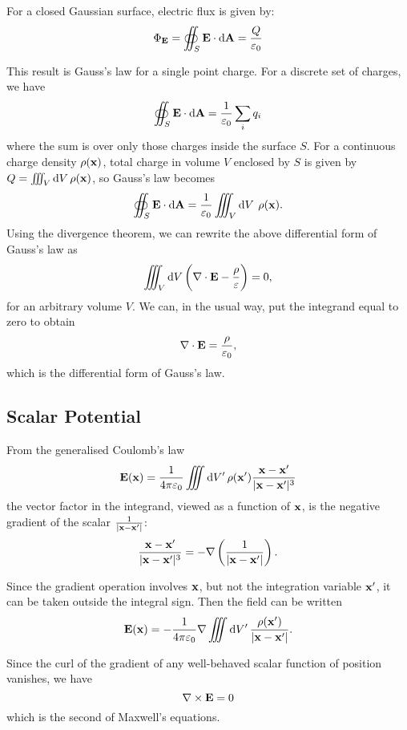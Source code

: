 \begin{law}
For a closed Gaussian surface, electric flux is given by:
\begin{equation}\label{eqn:gauss-law-single}
\Phi_{\vb{E}}=\oiint_S\vb{E}\cdot\dd{\vb{A}}=\frac{Q}{\varepsilon_0}
\end{equation}
\end{law}

This result is Gauss's law for a single point charge. For a discrete set of charges, we have
\[\oiint_S\vb{E}\cdot\dd{\vb{A}}=\frac{1}{\varepsilon_0}\sum_i q_i\]
where the sum is over only those charges inside the surface $S$. For a continuous charge density $\rho(\vb{x})$, total charge in volume $V$ enclosed by $S$ is given by $Q=\iiint_V\dd{V}\rho(\vb{x})$, so Gauss's law becomes
\[\oiint_S\vb{E}\cdot\dd{\vb{A}}=\frac{1}{\varepsilon_0}\iiint_V\dd{V}\:\rho(\vb{x}).\]
Using the divergence theorem, we can rewrite the above differential form of Gauss's law as
\[\iiint_V\dd{V}\left(\nabla\cdot\vb{E}-\frac{\rho}{\varepsilon}\right)=0,\]
for an arbitrary volume $V$. We can, in the usual way, put the integrand equal to zero to obtain
\begin{equation}
\nabla\cdot\vb{E}=\frac{\rho}{\varepsilon_0},
\end{equation}
which is the differential form of Gauss's law.

\subsection{Scalar Potential}
From the generalised Coulomb's law
\[\vb{E}(\vb{x})=\frac{1}{4\pi\varepsilon_0}\iiint\dd{V^\prime}\rho(\vb{x}^\prime)\frac{\vb{x}-\vb{x}^\prime}{|\vb{x}-\vb{x}^\prime|^3}\]
the vector factor in the integrand, viewed as a function of $\vb{x}$, is the negative gradient of the scalar $\frac{1}{|\vb{x}-\vb{x}^\prime|}$:
\[\frac{\vb{x}-\vb{x}^\prime}{|\vb{x}-\vb{x}^\prime|^3}=-\nabla\left(\frac{1}{|\vb{x}-\vb{x}^\prime|}\right).\]

Since the gradient operation involves $\vb{x}$, but not the integration variable $\vb{x}^\prime$, it can be taken outside the integral sign. Then the field can be written
\[\vb{E}(\vb{x})=-\frac{1}{4\pi\varepsilon_0}\nabla\iiint\dd{V^\prime}\frac{\rho(\vb{x}^\prime)}{|\vb{x}-\vb{x}^\prime|}.\]

Since the curl of the gradient of any well-behaved scalar function of position vanishes, we have
\begin{equation}
\nabla\times\vb{E}=0
\end{equation}
which is the second of Maxwell's equations.

